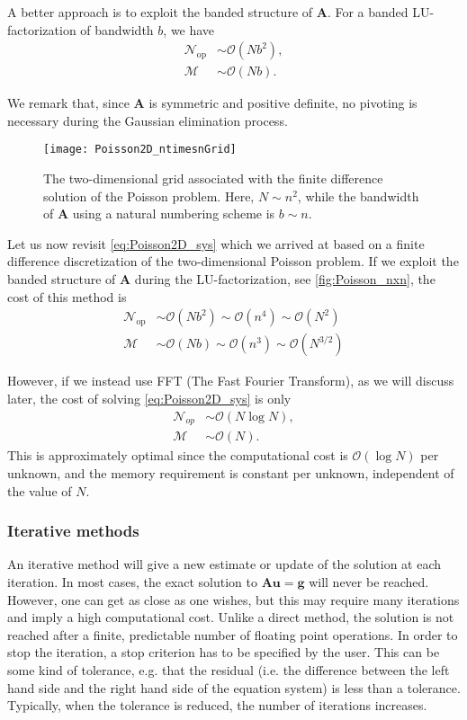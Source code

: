 A better approach is to exploit the banded structure of $\bm A$. For a banded
LU-factorization of bandwidth $b$, we have
\begin{align*}
  \mathcal{N}_\text{op} &\sim \mathcal{O}(N b^2) ,\\
  \mathcal{M} &\sim \mathcal{O}(N b) .
\end{align*}

We remark that, since $\bm A$ is symmetric and positive definite, no pivoting is
necessary during the Gaussian elimination process.

\begin{figure}
  \centering
  \texttt{[image: Poisson2D\_ntimesnGrid]}
  \caption{
    The two-dimensional grid associated with the finite difference solution of
    the Poisson problem. Here, $N \sim n^2$, while the bandwidth of
    $\bm A$ using a natural numbering scheme is $b\sim n$.
  }
  \label{fig:Poisson_nxn}
\end{figure}

Let us now revisit \eqref{eq:Poisson2D_sys} which we arrived at based on a
finite difference discretization of the two-dimensional Poisson problem. If we
exploit the banded structure of $\bm A$ during the LU-factorization, see
\autoref{fig:Poisson_nxn}, the cost of this method is
\begin{align*}
  \mathcal{N}_\text{op} &\sim \mathcal{O}(N b^2)
                          \sim \mathcal{O}(n^4) \sim \mathcal{O}(N^2)\\
  \mathcal{M} &\sim \mathcal{O}(N b) \sim \mathcal{O}(n^3) \sim \mathcal{O}(N^{3/2})
\end{align*}

However, if we instead use FFT (The Fast Fourier Transform), as we will discuss
later, the cost of solving \eqref{eq:Poisson2D_sys} is only
\begin{align*}
  \mathcal{N}_{op} &\sim \mathcal{O}(N \log N), \\
  \mathcal{M} &\sim \mathcal{O}(N).
\end{align*}
This is approximately optimal since the computational cost is $\mathcal{O}(\log
N)$ per unknown, and the memory requirement is constant per unknown, independent
of the value of $N$.

\subsubsection{Iterative methods}

An iterative method will give a new estimate or update of the solution at each
iteration. In most cases, the exact solution to $\bm A \bm u = \bm g$ will never
be reached. However, one can get as close as one wishes, but this may require
many iterations and imply a high computational cost. Unlike a direct method, the
solution is not reached after a finite, predictable number of floating point
operations. In order to stop the iteration, a stop criterion has to be specified
by the user. This can be some kind of tolerance, e.g. that the residual (i.e.
the difference between the left hand side and the right hand side of the
equation system) is less than a tolerance. Typically, when the tolerance is
reduced, the number of iterations increases.

